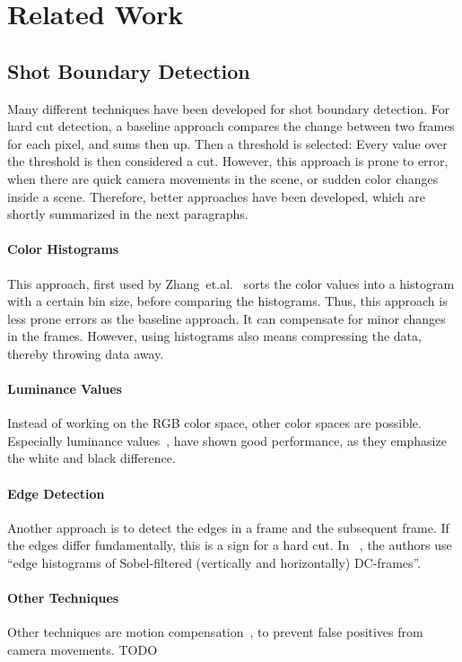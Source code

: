 \section{Related Work}
\label{sec:related_work}

\subsection{Shot Boundary Detection}

Many different techniques have been developed for shot boundary detection.
For hard cut detection, a baseline approach compares the change between two frames for each pixel, and sums then up.
Then a threshold is selected: Every value over the threshold is then considered a cut.
However, this approach is prone to error, when there are quick camera movements in the scene, or sudden color changes inside a scene.
Therefore, better approaches have been developed, which are shortly summarized in the next paragraphs.

\paragraph{Color Histograms}
This approach, first used by Zhang~et.al.~\cite{zhang1993automatic} sorts the color values into a histogram with a certain bin size, before comparing the histograms.
Thus, this approach is less prone errors as the baseline approach.
It can compensate for minor changes in the frames.
However, using histograms also means compressing the data, thereby throwing data away.

\paragraph{Luminance Values}
Instead of working on the RGB color space, other color spaces are possible.
Especially luminance values~\cite{petersohn2004fraunhofer}, have shown good performance, as they emphasize the white and black difference.

\paragraph{Edge Detection}
Another approach is to detect the edges in a frame and the subsequent frame.
If the edges differ fundamentally, this is a sign for a hard cut.
In ~\cite{ewerth2005university}, the authors use ``edge histograms of Sobel-filtered (vertically and horizontally) DC-frames''.

\paragraph{Other Techniques}
Other techniques are motion compensation~\cite{}, to prevent false positives from camera movements.
TODO


